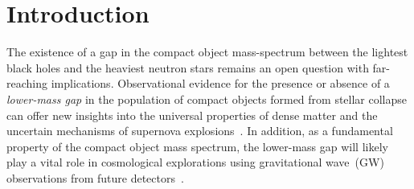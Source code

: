 \documentclass[modern]{aastex631}
\begin{document}
\section{Introduction}
\label{sec:intro}

The existence of a gap in the compact object mass-spectrum between the lightest black holes and the heaviest neutron stars remains an open question with far-reaching implications. Observational evidence for the presence or absence of a \textit{lower-mass gap} in the population of compact objects formed from stellar collapse can offer new insights into the universal properties of dense matter and the uncertain mechanisms of supernova explosions~\citep{Fryer:1999ht, Fryer:2011cx, Mandel:2020qwb, Zevin:2020gma, Liu:2020uba, Patton:2021gwh, Siegel:2022gwc}. In addition, as a fundamental property of the compact object mass spectrum, the lower-mass gap will likely play a vital role in cosmological explorations using gravitational wave~(GW) observations from future detectors~\citep{Ezquiaga:2022zkx}.
\end{document}
